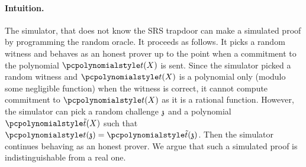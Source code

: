\paragraph{Intuition.} The simulator, that does not know the SRS trapdoor can make a simulated proof by programming the random oracle. It proceeds as follows. It picks a random witness and behaves as an honest prover up to the point when a commitment to the polynomial $\p{t}(X)$ is sent. Since the simulator picked a random witness and $\p{t}(X)$ is a polynomial only (modulo some negligible function) when the witness is correct, it cannot compute commitment to $\p{t}(X)$ as it is a rational function. However, the simulator can pick a random challenge $\mathfrak{z}$ and a polynomial $\p{\tilde{t}}(X)$ such that $\p{t} (\chz)  = \p{\tilde{t}} (\chz)$. Then the simulator continues behaving as an honest prover. We argue that such a simulated proof is indistinguishable from a real one.


